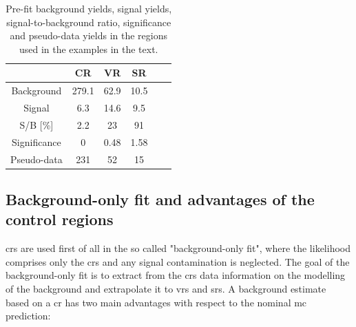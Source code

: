\begin{table}
\centering
\begin{tabular}{|c|c|c|c|c|c|}
\hline 
 & CR & VR & SR  \\ 
\hline 
Background & 279.1 & 62.9 & 10.5  \\ 
\hline 
Signal & 6.3 & 14.6 & 9.5 \\ 
\hline 
S/B [\%] & 2.2 & 23 & 91 \\ 
\hline 
Significance & 0 & 0.48 & 1.58 \\ 
\hline 
Pseudo-data & 231 & 52 & 15 \\ 
\hline 
\end{tabular} 
\caption{Pre-fit background yields, signal yields, signal-to-background ratio, significance and pseudo-data yields in the regions used in the examples in the text.}
\label{tab:stat:exampleyeilds}
\end{table}

\subsection{Background-only fit and advantages of the control regions}
\label{sec:example_cr}

\glspl{cr} are used first of all in the so called "background-only fit", where the likelihood comprises only the \glspl{cr} and any signal contamination is neglected. The goal of the background-only fit is to extract from the \glspl{cr} data information on the modelling of the background 
and extrapolate it to \glspl{vr} and \glspl{sr}. A background estimate based on a \gls{cr} has two main advantages with respect to the nominal \gls{mc} prediction:

